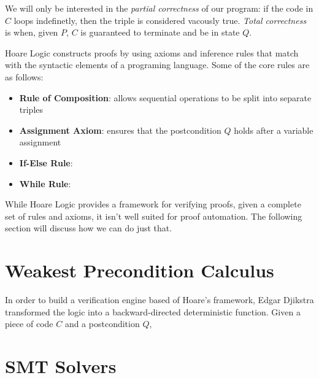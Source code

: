 We will only be interested in the \textit{partial correctness} of our program: if the code in $ C $ loops indefinetly, then the triple is considered vacously true. \textit{Total correctness} is when, given $ P $, $ C $ is guaranteed to terminate and be in state $ Q $.

Hoare Logic constructs proofs by using axioms and inference rules that match with the syntactic elements of a programing language. Some of the core rules are as follows:
\begin{itemize}
\item \textbf{Rule of Composition}: allows sequential operations to be split into separate triples
\item \textbf{Assignment Axiom}: ensures that the postcondition $ Q  $ holds after a variable assignment
\item \textbf{If-Else Rule}:
\item \textbf{While Rule}:
\end{itemize}

While Hoare Logic provides a framework for verifying proofs, given a complete set of rules and axioms, it isn't well suited for proof automation. The following section will discuss how we can do just that. 

\section{Weakest Precondition Calculus}
In order to build a verification engine based of Hoare's framework, Edgar Djikstra transformed the logic into a backward-directed deterministic function. Given a piece of code $ C $ and a postcondition $ Q  $, 

\section{SMT Solvers}


% 
